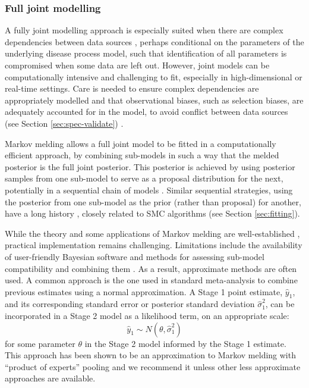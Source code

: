 \documentclass{article}
\begin{document}
\subsubsection{Full joint modelling}\label{sec:joint}

A fully joint modelling approach is especially suited when there are complex dependencies between data sources \citep{corbella2022inferring}, perhaps conditional on the parameters of the underlying disease process model, such that identification of all parameters is compromised when some data are left out. However, joint models can be computationally intensive and challenging to fit, especially in high-dimensional or real-time settings. Care is needed to ensure complex dependencies are appropriately modelled and that observational biases, such as selection biases, are adequately accounted for in the model, to avoid conflict between data sources (see
Section \ref{sec:spec-validate}) \citep{presanis2013conflict,corbella2022inferring}. 

Markov melding \citep{goudie2019joining} allows a full joint model to be fitted in a computationally efficient approach, by combining sub-models in such a way that the melded posterior is the full joint posterior. This posterior is achieved by using posterior samples from one sub-model to serve as a proposal distribution for the next, potentially in a sequential chain of models \citep{manderson2023combining}. Similar sequential strategies, using the posterior from one sub-model as the prior (rather than proposal) for another, have a long history \citep{west1997bayesian}, closely related to \ac{SMC} algorithms \citep{doucet2001introduction} (see Section \ref{sec:fitting}).

While the theory and some applications of Markov melding are well-established \citep{goudie2019joining,nicholson2022interoperability,manderson2023combining}, practical implementation remains challenging. Limitations include the availability of user-friendly Bayesian software and methods for assessing sub-model compatibility and combining them \citep{goudie2019joining,yang2025detecting}. As a result, approximate methods are often used. A common approach is the one used in standard meta-analysis \citep{borenstein2021introduction} to combine previous estimates using a normal approximation. A Stage 1 point estimate, $\hat{y}_1$, and its corresponding standard error or posterior standard deviation $\hat{\sigma}^2_1$, can be incorporated in a Stage 2 model as a likelihood term, on an appropriate scale:
$$
\hat{y}_1 \sim N(\theta, \hat{\sigma}^2_1)
$$ for some parameter $\theta$ in the Stage 2 model informed by the Stage 1 estimate. This approach has been shown to be an approximation to Markov melding with ``product of experts'' pooling \citep{goudie2019joining} and we recommend it unless other less approximate approaches are available.
\end{document}
